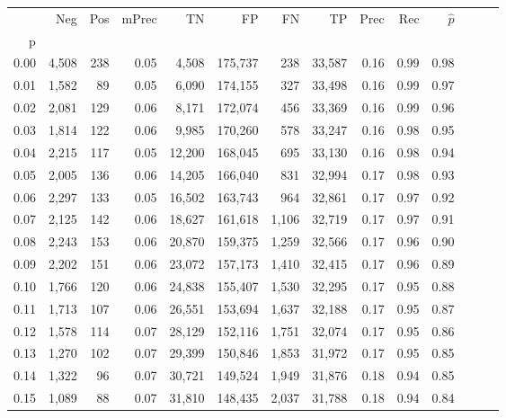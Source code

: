 \begin{tabular}{rrrrrrrrrrrrrr}
\toprule
{} &    Neg &  Pos & mPrec &       TN &       FP &      FN &      TP &  Prec &   Rec & $\hat{p}$ \\
p    &        &      &       &          &          &         &         &       &       &           \\
\midrule
0.00 &  4,508 &  238 &  0.05 &    4,508 &  175,737 &     238 &  33,587 &  0.16 &  0.99 &      0.98 \\
0.01 &  1,582 &   89 &  0.05 &    6,090 &  174,155 &     327 &  33,498 &  0.16 &  0.99 &      0.97 \\
0.02 &  2,081 &  129 &  0.06 &    8,171 &  172,074 &     456 &  33,369 &  0.16 &  0.99 &      0.96 \\
0.03 &  1,814 &  122 &  0.06 &    9,985 &  170,260 &     578 &  33,247 &  0.16 &  0.98 &      0.95 \\
0.04 &  2,215 &  117 &  0.05 &   12,200 &  168,045 &     695 &  33,130 &  0.16 &  0.98 &      0.94 \\
0.05 &  2,005 &  136 &  0.06 &   14,205 &  166,040 &     831 &  32,994 &  0.17 &  0.98 &      0.93 \\
0.06 &  2,297 &  133 &  0.05 &   16,502 &  163,743 &     964 &  32,861 &  0.17 &  0.97 &      0.92 \\
0.07 &  2,125 &  142 &  0.06 &   18,627 &  161,618 &   1,106 &  32,719 &  0.17 &  0.97 &      0.91 \\
0.08 &  2,243 &  153 &  0.06 &   20,870 &  159,375 &   1,259 &  32,566 &  0.17 &  0.96 &      0.90 \\
0.09 &  2,202 &  151 &  0.06 &   23,072 &  157,173 &   1,410 &  32,415 &  0.17 &  0.96 &      0.89 \\
0.10 &  1,766 &  120 &  0.06 &   24,838 &  155,407 &   1,530 &  32,295 &  0.17 &  0.95 &      0.88 \\
0.11 &  1,713 &  107 &  0.06 &   26,551 &  153,694 &   1,637 &  32,188 &  0.17 &  0.95 &      0.87 \\
0.12 &  1,578 &  114 &  0.07 &   28,129 &  152,116 &   1,751 &  32,074 &  0.17 &  0.95 &      0.86 \\
0.13 &  1,270 &  102 &  0.07 &   29,399 &  150,846 &   1,853 &  31,972 &  0.17 &  0.95 &      0.85 \\
0.14 &  1,322 &   96 &  0.07 &   30,721 &  149,524 &   1,949 &  31,876 &  0.18 &  0.94 &      0.85 \\
0.15 &  1,089 &   88 &  0.07 &   31,810 &  148,435 &   2,037 &  31,788 &  0.18 &  0.94 &      0.84 \\

\end{tabular}
